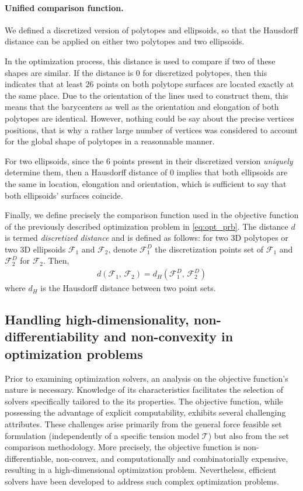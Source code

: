 \paragraph*{Unified comparison function.} We defined a discretized version of polytopes and ellipsoids, so that the Hausdorff distance can be applied on either two polytopes and two ellipsoids.

In the optimization process, this distance is used to compare if two of these shapes are similar. If the distance is $0$ for discretized polytopes, then this indicates that at least $26$ points on both polytope surfaces are located exactly at the same place. Due to the orientation of the lines used to construct them, this means that the barycenters as well as the orientation and elongation of both polytopes are identical. However, nothing could be say about the precise vertices positions, that is why a rather large number of vertices was considered to account for the global shape of polytopes in a reasonnable manner.

For two ellipsoids, since the 6 points present in their discretized version \emph{uniquely} determine them, then a Hausdorff distance of $0$ implies that both ellipsoids are  the same in location, elongation and orientation, which is sufficient to say that both ellipsoids' surfaces coincide.

Finally, we define precisely the comparison function used in the objective function of the previously described optimization problem in \ref{eq:opt_prb}. The distance $d$ is termed \emph{discretized distance} and is defined as follows: for two 3D polytopes or two 3D ellipsoids $\mathcal{F}_1$ and $\mathcal{F}_2$, denote $\mathcal{F}_1^D$ the discretization points set of $\mathcal{F}_1$ and $\mathcal{F}_2^D$ for $\mathcal{F}_2$. Then, 
\begin{align*}
    d(\mathcal{F}_1,\, \mathcal{F}_2) = d_H(\mathcal{F}_1^D,\, \mathcal{F}_2^D)
\end{align*}
where $d_H$ is the Hausdorff distance between two point sets.

\subsection{Handling high-dimensionality, non-differentiability and non-convexity in optimization problems}
\label{subsec:non_differentiability}

Prior to examining optimization solvers, an analysis on the objective function's nature is necessary. Knowledge of its characteristics facilitates the selection of solvers specifically tailored to the its properties. The objective function, while possessing the advantage of explicit computability, exhibits several challenging attributes. These challenges arise primarily from the general force feasible set formulation (independently of a specific tension model $\mathcal{T}$) but also from the set comparison methodology. More precisely, the objective function is non-differentiable, non-convex, and computationally and combinatorially expensive, resulting in a high-dimensional optimization problem.  Nevertheless, efficient solvers have been developed to address such complex optimization problems.

